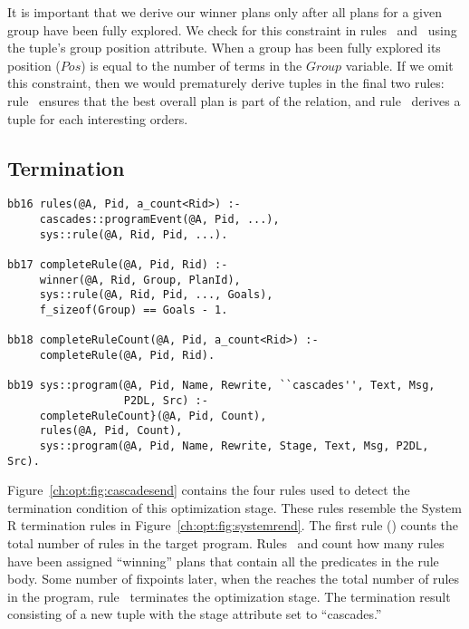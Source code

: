 It is important that we derive our winner plans only after all plans for a
given group have been fully explored.  We check for this constraint in
rules~ and~ using the  tuple's group position
attribute.  When a group has been fully explored its  position
($Pos$) is equal to the number of terms in the $Group$ variable.  If we omit
this constraint, then we would prematurely derive  tuples in the
final two rules: rule~ ensures that the best overall plan is part of
the  relation, and rule~ derives a  tuple for
each interesting orders.

\subsection{Termination}
\label{ch:opt:sec:cascadesend}

\begin{figure*}
\ssp
\centering
\begin{lstlisting}
bb16 rules(@A, Pid, a_count<Rid>) :-
     cascades::programEvent(@A, Pid, ...),
     sys::rule(@A, Rid, Pid, ...).

bb17 completeRule(@A, Pid, Rid) :-
     winner(@A, Rid, Group, PlanId),
     sys::rule(@A, Rid, Pid, ..., Goals),
     f_sizeof(Group) == Goals - 1.

bb18 completeRuleCount(@A, Pid, a_count<Rid>) :-
     completeRule(@A, Pid, Rid).

bb19 sys::program(@A, Pid, Name, Rewrite, ``cascades'', Text, Msg, 
                  P2DL, Src) :-
     completeRuleCount}(@A, Pid, Count),
     rules(@A, Pid, Count),
     sys::program(@A, Pid, Name, Rewrite, Stage, Text, Msg, P2DL, Src).
\end{lstlisting}
\caption{\label{ch:opt:fig:cascadesend}Cascades termination rules.}
\end{figure*}

Figure~\ref{ch:opt:fig:cascadesend} contains the four rules used to detect the
termination condition of this optimization stage.  These rules resemble the
System R termination rules in Figure~\ref{ch:opt:fig:systemrend}.  The first
rule () counts the total number of rules in the target program.
Rules~ and  count how many rules have been assigned
``winning'' plans that contain all the predicates in the rule body.  Some
number of fixpoints later, when the  reaches the total
number of rules in the program, rule~ terminates the optimization
stage.  The termination result consisting of a new  tuple with the
stage attribute set to ``cascades.''

